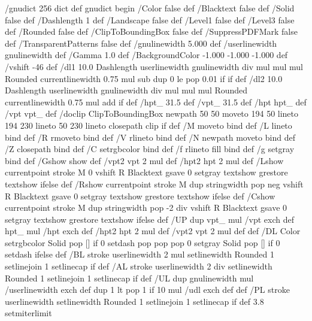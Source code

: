 /gnudict 256 dict def
gnudict begin
%
%
/Color false def
/Blacktext false def
/Solid false def
/Dashlength 1 def
/Landscape false def
/Level1 false def
/Level3 false def
/Rounded false def
/ClipToBoundingBox false def
/SuppressPDFMark false def
/TransparentPatterns false def
/gnulinewidth 5.000 def
/userlinewidth gnulinewidth def
/Gamma 1.0 def
/BackgroundColor {-1.000 -1.000 -1.000} def
%
/vshift -46 def
/dl1 {
  10.0 Dashlength userlinewidth gnulinewidth div mul mul mul
  Rounded { currentlinewidth 0.75 mul sub dup 0 le { pop 0.01 } if } if
} def
/dl2 {
  10.0 Dashlength userlinewidth gnulinewidth div mul mul mul
  Rounded { currentlinewidth 0.75 mul add } if
} def
/hpt_ 31.5 def
/vpt_ 31.5 def
/hpt hpt_ def
/vpt vpt_ def
/doclip {
  ClipToBoundingBox {
    newpath 50 50 moveto 194 50 lineto 194 230 lineto 50 230 lineto closepath
    clip
  } if
} def
%
%
%
/M {moveto} bind def
/L {lineto} bind def
/R {rmoveto} bind def
/V {rlineto} bind def
/N {newpath moveto} bind def
/Z {closepath} bind def
/C {setrgbcolor} bind def
/f {rlineto fill} bind def
/g {setgray} bind def
/Gshow {show} def   %
/vpt2 vpt 2 mul def
/hpt2 hpt 2 mul def
/Lshow {currentpoint stroke M 0 vshift R 
	Blacktext {gsave 0 setgray textshow grestore} {textshow} ifelse} def
/Rshow {currentpoint stroke M dup stringwidth pop neg vshift R
	Blacktext {gsave 0 setgray textshow grestore} {textshow} ifelse} def
/Cshow {currentpoint stroke M dup stringwidth pop -2 div vshift R 
	Blacktext {gsave 0 setgray textshow grestore} {textshow} ifelse} def
/UP {dup vpt_ mul /vpt exch def hpt_ mul /hpt exch def
  /hpt2 hpt 2 mul def /vpt2 vpt 2 mul def} def
/DL {Color {setrgbcolor Solid {pop []} if 0 setdash}
 {pop pop pop 0 setgray Solid {pop []} if 0 setdash} ifelse} def
/BL {stroke userlinewidth 2 mul setlinewidth
	Rounded {1 setlinejoin 1 setlinecap} if} def
/AL {stroke userlinewidth 2 div setlinewidth
	Rounded {1 setlinejoin 1 setlinecap} if} def
/UL {dup gnulinewidth mul /userlinewidth exch def
	dup 1 lt {pop 1} if 10 mul /udl exch def} def
/PL {stroke userlinewidth setlinewidth
	Rounded {1 setlinejoin 1 setlinecap} if} def
3.8 setmiterlimit
